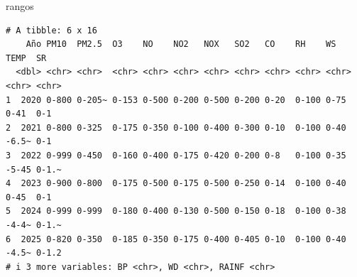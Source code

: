 \documentclass[
  letterpaper,
  DIV=11,
  numbers=noendperiod]{scrartcl}
\newenvironment{Shaded}{\begin{snugshade}}{\end{snugshade}}
\newcommand{\NormalTok}[1]{\textcolor[rgb]{0.00,0.23,0.31}{#1}}
\begin{document}
\begin{Shaded}
\begin{Highlighting}[]
\NormalTok{rangos}
\end{Highlighting}
\end{Shaded}

\begin{verbatim}
# A tibble: 6 x 16
    Año PM10  PM2.5  O3    NO    NO2   NOX   SO2   CO    RH    WS    TEMP  SR   
  <dbl> <chr> <chr>  <chr> <chr> <chr> <chr> <chr> <chr> <chr> <chr> <chr> <chr>
1  2020 0-800 0-205~ 0-153 0-500 0-200 0-500 0-200 0-20  0-100 0-75  0-41  0-1  
2  2021 0-800 0-325  0-175 0-350 0-100 0-400 0-300 0-10  0-100 0-40  -6.5~ 0-1  
3  2022 0-999 0-450  0-160 0-400 0-175 0-420 0-200 0-8   0-100 0-35  -5-45 0-1.~
4  2023 0-900 0-800  0-175 0-500 0-175 0-500 0-250 0-14  0-100 0-40  0-45  0-1  
5  2024 0-999 0-999  0-180 0-400 0-130 0-500 0-150 0-18  0-100 0-38  -4-4~ 0-1.~
6  2025 0-820 0-350  0-185 0-350 0-175 0-400 0-405 0-10  0-100 0-40  -4.5~ 0-1.2
# i 3 more variables: BP <chr>, WD <chr>, RAINF <chr>
\end{verbatim}
\end{document}
